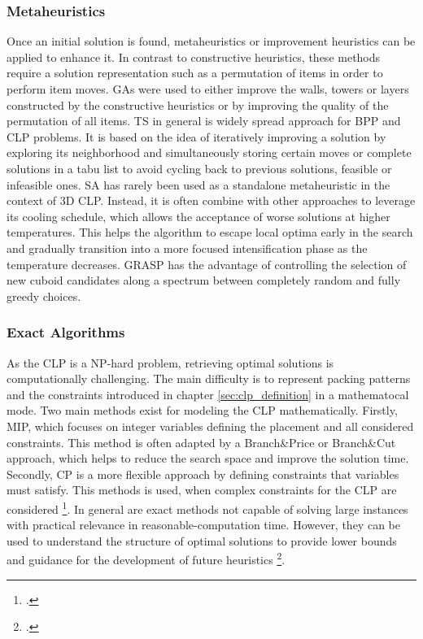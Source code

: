 \subsubsection{Metaheuristics}
Once an initial solution is found, metaheuristics or improvement heuristics can be applied
to enhance it. In contrast to constructive heuristics, these methods require a solution
representation such as a permutation of items in order to perform item moves. \gls{GA}s were
used to either improve the walls, towers or layers constructed by the constructive heuristics
or by improving the quality of the permutation of all items.
\gls{TS} in general is widely spread approach for \gls{BPP} and \gls{CLP} problems. It is based on
the idea of iteratively improving a solution by exploring its neighborhood and simultaneously
storing certain moves or complete solutions in a tabu list to avoid cycling back to
previous solutions, feasible or infeasible ones. \gls{SA} has rarely been used as a
standalone metaheuristic in the context of \gls{3D} \gls{CLP}. Instead, it is often combine
with other approaches to leverage its cooling schedule, which allows the acceptance of
worse solutions at higher temperatures. This helps the algorithm to escape local optima
early in the search and gradually transition into a more focused intensification phase as
the temperature decreases. \gls{GRASP} has the advantage of controlling the selection of new
cuboid candidates along a spectrum between completely random and fully greedy choices.

\subsubsection{Exact Algorithms}
As the \gls{CLP} is a NP-hard problem, retrieving optimal solutions is computationally
challenging. The main difficulty is to represent packing patterns and the constraints
introduced in chapter \ref{sec:clp_definition} in a mathematocal mode. Two main methods
exist for modeling the \gls{CLP} mathematically. Firstly, \gls{MIP}, which focuses on
integer variables defining the placement and all considered constraints. This method is
often adapted by a Branch\&Price or Branch\&Cut approach, which helps to reduce the
search space and improve the solution time. Secondly, \gls{CP} is a more flexible
approach by defining constraints that variables must satisfy. This methods is used, when
complex constraints for the \gls{CLP} are considered \footcite[cf.][p. 7--11]{tamke_branch-and-cut_2024}.
In general are exact methods not capable of solving large instances with practical relevance
in reasonable-computation time. However, they can be used to understand the structure
of optimal solutions to provide lower bounds and guidance for the development of future
heuristics \footcite[cf.][p.2]{tamke_branch-and-cut_2024}.